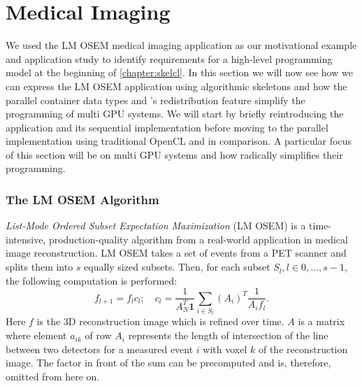 \section{Medical Imaging}
\label{section:medical-imaging}

We used the LM OSEM medical imaging application as our motivational example and application study to identify requirements for a high-level programming model at the beginning of \autoref{chapter:skelcl}.
In this section we will now see how we can express the LM OSEM application using algorithmic skeletons and how the parallel container data types and \SkelCL's redistribution feature simplify the programming of multi GPU systems.
We will start by briefly reintroducing the application and its sequential implementation before moving to the parallel implementation using traditional OpenCL and \SkelCL in comparison.
A particular focus of this section will be on multi GPU systems and how \SkelCL radically simplifies their programming.

\subsubsection*{The LM OSEM Algorithm}
\emph{List-Mode Ordered Subset Expectation Maximization} (LM OSEM) is a time-intensive, production-quality algorithm from a real-world application in medical image reconstruction.
LM OSEM takes a set of events from a PET scanner and splits them into $s$ equally sized subsets.
Then, for each subset $S_l, l \in {0, \ldots, s-1}$, the following computation is performed:
\begin{equation}
 f_{l+1}=f_{l}c_{l};\quad
 c_{l}=\dfrac{1}{A_N^T \textbf{1}}
\sum_{i \in S_{l}} (A_i)^T \dfrac{1}{A_{i} f_{l}}.
\label{eq:lm_osem2}
\end{equation}
Here $f$ is the 3D reconstruction image which is refined over time.
$A$ is a matrix where element $a_{ik}$ of row $A_i$ represents the length of intersection of the line between two detectors for a measured event $i$ with voxel $k$ of the reconstruction image.
The factor in front of the sum can be precomputed and is, therefore, omitted from here on.

